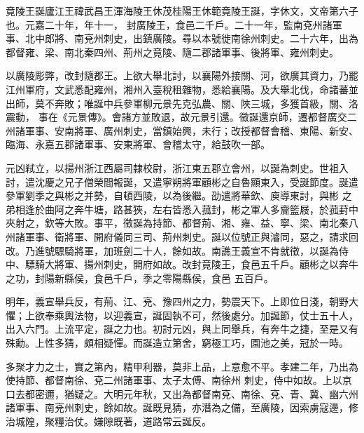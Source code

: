 
\begin{pinyinscope}

 竟陵王誕廬江王禕武昌王渾海陵王休茂桂陽王休範竟陵王誕，字休文，文帝第六子也。元嘉二十年，年十一，
 封廣陵王，食邑二千戶。二十一年，監南兗州諸軍事、北中郎將、南兗州刺史，出鎮廣陵。尋以本號徙南徐州刺史。二十六年，出為都督雍、梁、南北秦四州、荊州之竟陵、隨二郡諸軍事、後將軍、雍州刺史。



 以廣陵彫弊，改封隨郡王。上欲大舉北討，以襄陽外接關、河，欲廣其資力，乃罷江州軍府，文武悉配雍州，湘州入臺稅租雜物，悉給襄陽。及大舉北伐，命諸蕃並出師，莫不奔敗；唯誕中兵參軍柳元景先克弘農、關、陜三城，多獲首級，關、洛震動，
 事在《元景傳》。會諸方並敗退，故元景引還。徵誕還京師，遷都督廣交二州諸軍事、安南將軍、廣州刺史，當鎮始興，未行；改授都督會稽、東陽、新安、臨海、永嘉五郡諸軍事、安東將軍、會稽太守，給鼓吹一部。



 元凶弒立，以揚州浙江西屬司隸校尉，浙江東五郡立會州，以誕為刺史。世祖入討，遣沈慶之兄子僧榮間報誕，又遣寧朔將軍顧彬之自魯顯東入，受誕節度。誕遣參軍劉季之與彬之并勢，自頓西陵，以為後繼。劭遣將華欽、庾導東討，與彬
 之弟相逢於曲阿之奔牛塘，路甚狹，左右皆悉入菰封，彬之軍人多齎籃屐，於菰葑中夾射之，欽等大敗。事平，徵誕為持節、都督荊、湘、雍、益、寧、梁、南北秦八州諸軍事、衛將軍、開府儀同三司、荊州刺史。誕以位號正與濬同，惡之，請求回改。乃進號驃騎將軍，加班劍二十人，餘如故。南譙王義宣不肯就徵，以誕為侍中、驃騎大將軍、揚州刺史，開府如故。改封竟陵王，食邑五千戶。顧彬之以奔牛之功，封陽新縣侯，食邑千戶，季之零陽縣侯，食邑
 五百戶。



 明年，義宣舉兵反，有荊、江、兗、豫四州之力，勢震天下。上即位日淺，朝野大懼；上欲奉乘輿法物，以迎義宣，誕固執不可，然後處分。加誕節，仗士五十人，出入六門。上流平定，誕之力也。初討元凶，與上同舉兵，有奔牛之捷，至是又有殊勳。上性多猜，頗相疑憚。而誕造立第舍，窮極工巧，園池之美，冠於一時。



 多聚才力之士，實之第內，精甲利器，莫非上品，上意愈不平。孝建二年，乃出為使持節、都督南徐、兗二州諸軍事、太子太傅、南徐州
 刺史，侍中如故。上以京口去都密邇，猶疑之。大明元年秋，又出為都督南兗、南徐、兗、青、冀、幽六州諸軍事、南兗州刺史，餘如故。誕既見猜，亦潛為之備，至廣陵，因索虜寇邊，修治城隍，聚糧治仗。嫌隙既著，道路常云誕反。




\end{pinyinscope}
